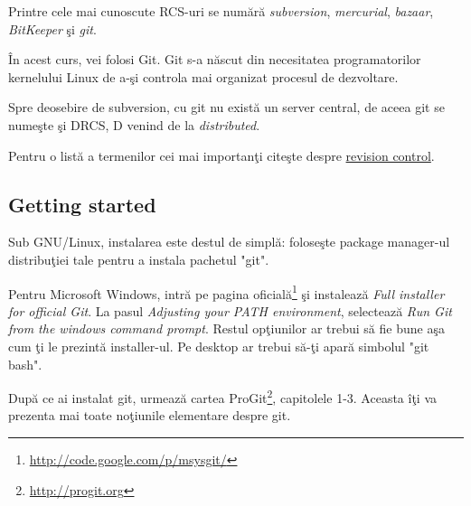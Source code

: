 Printre cele mai cunoscute RCS-uri se numără \textit{subversion},
\textit{mercurial}, \textit{bazaar}, \textit{BitKeeper} şi \textit{git}.

În acest curs, vei folosi Git. Git s-a născut din necesitatea
programatorilor kernelului Linux de a-şi controla mai organizat
procesul de dezvoltare.

Spre deosebire de subversion, cu git nu există un server central,
de aceea git se numeşte şi DRCS, D venind de la \textsl{distributed}.

Pentru o listă a termenilor cei mai importanţi citeşte despre
\href{http://en.wikipedia.org/wiki/Revision_control}{revision control}.

\subsection{Getting started}
Sub GNU/Linux, instalarea este destul de simplă: foloseşte
package manager-ul distribuţiei tale pentru a instala pachetul "git".

Pentru Microsoft Windows,
intră pe pagina oficială\footnote{\url{http://code.google.com/p/msysgit/}}
şi instalează \textit{Full installer for official Git}. La pasul
\textit{Adjusting your PATH environment}, selectează \textit{Run
Git from the windows command prompt}. Restul opţiunilor ar trebui
să fie bune aşa cum ţi le prezintă installer-ul. Pe desktop ar trebui
să-ţi apară simbolul "git bash".

După ce ai instalat git, urmează cartea ProGit\footnote{\url{http://progit.org}},
capitolele 1-3. Aceasta îţi va prezenta mai toate noţiunile elementare
despre git.

